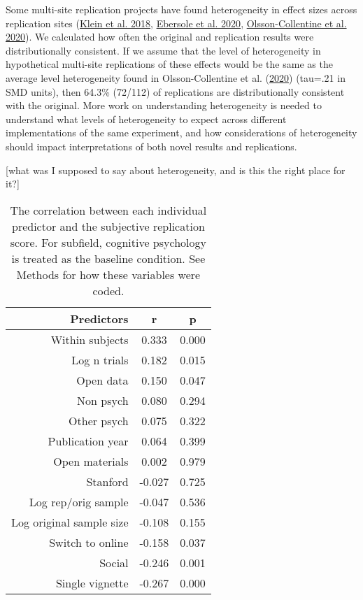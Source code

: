 \documentclass[
  english,
  a4paper,
]{article}
\begin{document}
Some multi-site replication projects have found heterogeneity in effect sizes across replication sites (\protect\hyperlink{ref-klein2018}{Klein et al. 2018}, \protect\hyperlink{ref-ebersole2020}{Ebersole et al. 2020}, \protect\hyperlink{ref-olsson2020}{Olsson-Collentine et al. 2020}). We calculated how often the original and replication results were distributionally consistent. If we assume that the level of heterogeneity in hypothetical multi-site replications of these effects would be the same as the average level heterogeneity found in Olsson-Collentine et al. (\protect\hyperlink{ref-olsson2020}{2020}) (tau=.21 in SMD units), then 64.3\% (72/112) of replications are distributionally consistent with the original. More work on understanding heterogeneity is needed to understand what levels of heterogeneity to expect across different implementations of the same experiment, and how considerations of heterogeneity should impact interpretations of both novel results and replications.

{[}what was I supposed to say about heterogeneity, and is this the right place for it?{]}

\begin{table}[!h]

\caption{\label{tab:cor}The correlation between each individual predictor and the subjective replication score. For subfield, cognitive psychology is treated as the baseline condition. See Methods for how these variables were coded.}
\centering
\fontsize{10}{12}\selectfont
\begin{tabular}[t]{r|c|c}
\hline
Predictors & r & p\\
\hline
Within subjects & 0.333 & 0.000\\
\hline
Log n trials & 0.182 & 0.015\\
\hline
Open data & 0.150 & 0.047\\
\hline
Non psych & 0.080 & 0.294\\
\hline
Other psych & 0.075 & 0.322\\
\hline
Publication year & 0.064 & 0.399\\
\hline
Open materials & 0.002 & 0.979\\
\hline
Stanford & -0.027 & 0.725\\
\hline
Log rep/orig sample & -0.047 & 0.536\\
\hline
Log original sample size & -0.108 & 0.155\\
\hline
Switch to online & -0.158 & 0.037\\
\hline
Social & -0.246 & 0.001\\
\hline
Single vignette & -0.267 & 0.000\\
\hline
\end{tabular}
\end{table}
\end{document}
